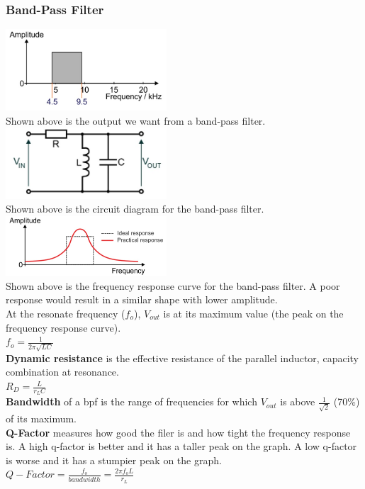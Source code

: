 \documentclass[a4paper,11pt, twocolumn]{article}
\begin{document}
\subsubsection{Band-Pass Filter}
\includegraphics[width=0.45\textwidth]{bpfBasicGraph.jpg}\\
Shown above is the output we want from a band-pass filter.\\
\includegraphics[width=0.45\textwidth]{bpfCircuit.jpg}\\
Shown above is the circuit diagram for the band-pass filter.\\
\includegraphics[width=0.45\textwidth]{bpfFreqResp.jpg}\\
Shown above is the frequency response curve for the band-pass filter. A poor response would result in a similar shape with lower amplitude. \\
At the resonate frequency ($f_o$), $V_{out}$ is at its maximum value (the peak on the frequency response curve). \\
$\displaystyle f_o = \frac{1}{2 \pi \sqrt{LC}}$\\
\textbf{Dynamic resistance} is the effective resistance of the parallel inductor, capacity combination at resonance.\\
$\displaystyle R_D = \frac{L}{r_L C}$\\
\textbf{Bandwidth} of a bpf is the range of frequencies for which $V_{out}$ is above $\frac{1}{\sqrt{2}}$ (70\%) of its maximum. \\
\textbf{Q-Factor} measures how good the filer is and how tight the frequency response is. A high q-factor is better and it has a taller peak on the graph. A low q-factor is worse and it has a stumpier peak on the graph. \\
$\displaystyle Q-Factor = \frac{f_o}{bandwidth} = \frac{2 \pi f_o L}{r_L}$
\end{document}
